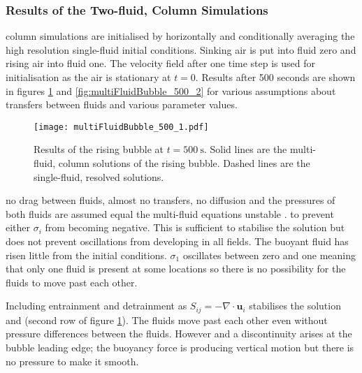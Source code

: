 \documentclass[draft]{agujournal2019}
\begin{document}
\subsubsection{Results of the Two-fluid,  Column Simulations}

 column simulations are initialised by horizontally
and conditionally averaging the high resolution single-fluid initial
conditions. Sinking air is put into fluid zero and rising air into
fluid one. The velocity field after one time step is used for initialisation
as the air is stationary at $t=0$. Results after 500 seconds are shown in figures \ref{fig:multiFluidBubble_500_1}
and \ref{fig:multiFluidBubble_500_2} for various assumptions about
transfers between fluids and various parameter values.

\begin{figure}
\noindent
\texttt{[image: multiFluidBubble\_500\_1.pdf]}
\caption{\label{fig:multiFluidBubble_500_1} Results of the rising bubble at $t=500\ \text{s}$. Solid lines are the multi-fluid,  column solutions of the rising bubble. Dashed lines are the single-fluid, resolved solutions.}
\end{figure}

no drag between fluids, almost no transfers, no diffusion and
the pressures of both fluids are assumed equal  the multi-fluid equations  unstable \cite{TEB19}. 
to prevent either $\sigma_{i}$ from becoming negative. This is sufficient to stabilise the solution but does not prevent oscillations from developing in all fields. The buoyant fluid has risen little from the initial conditions. $\sigma_1$ oscillates between zero and one meaning that only one fluid is present at some locations so there is no possibility for the fluids to move past each other.

Including entrainment and detrainment as $S_{ij}=-\nabla\cdot\mathbf{u}_{i}$ stabilises the solution and
 (second row of
figure \ref{fig:multiFluidBubble_500_1}).
The fluids move  past each other
even without pressure differences between the fluids. However 
and a discontinuity arises at the bubble leading edge; the buoyancy force is producing vertical motion but there is no pressure to make it smooth. 
\end{document}
